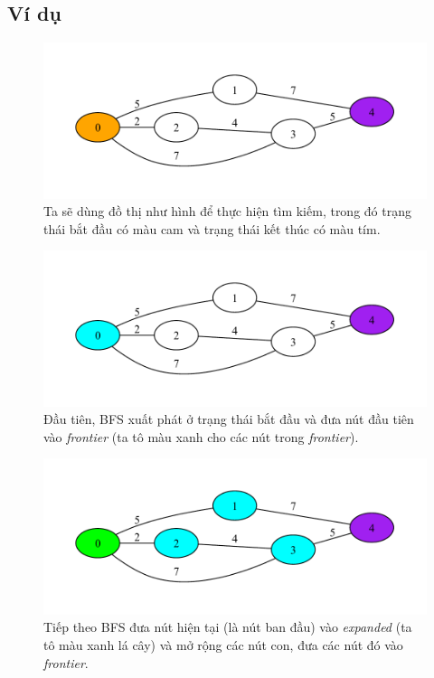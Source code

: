 \subsection{Ví dụ}

\begin{figure}[H]
    \centering
    \includegraphics[scale=0.8]{figure/init.pdf}
    \caption{Ta sẽ dùng đồ thị như hình để thực hiện tìm kiếm, trong đó trạng thái bắt đầu có màu cam và trạng thái kết thúc có màu tím.}
    \label{fig:init}
\end{figure}

\begin{figure}[H]
    \centering
    \includegraphics[scale=0.8]{figure/BFS/0.pdf}
    \caption{Đầu tiên, BFS xuất phát ở trạng thái bắt đầu và đưa nút đầu tiên vào \textit{frontier} (ta tô màu xanh cho các nút trong \textit{frontier}).}
    \label{fig:BFS_0}
\end{figure}

\begin{figure}[H]
    \centering
    \includegraphics[scale=0.8]{figure/BFS/1.pdf}
    \caption{Tiếp theo BFS đưa nút hiện tại (là nút ban đầu) vào \textit{expanded} (ta tô màu xanh lá cây) và mở rộng các nút con, đưa các nút đó vào \textit{frontier}.}
    \label{fig:BFS_1}
\end{figure}

